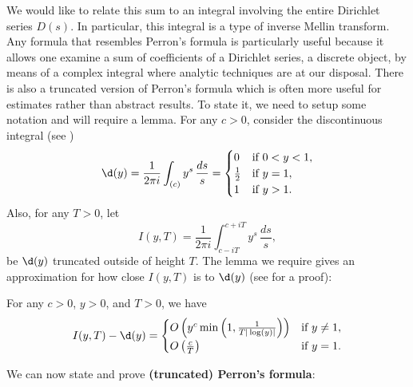     We would like to relate this sum to an integral involving the entire Dirichlet series $D(s)$. In particular, this integral is a type of inverse Mellin transform. Any formula that resembles Perron's formula is particularly useful because it allows one examine a sum of coefficients of a Dirichlet series, a discrete object, by means of a complex integral where analytic techniques are at our disposal. There is also a truncated version of Perron's formula which is often more useful for estimates rather than abstract results. To state it, we need to setup some notation and will require a lemma. For any $c > 0$, consider the discontinuous integral (see \cite{davenport1980multiplicative})
    \[
      \d(y) = \frac{1}{2\pi i}\int_{(c)}y^{s}\,\frac{ds}{s} = \begin{cases} 0 & \text{if $0 < y < 1$}, \\ \frac{1}{2} & \text{if $y = 1$}, \\ 1 & \text{if $y > 1$}. \end{cases}
    \]
    Also, for any $T > 0$, let
    \[
      I(y,T) = \frac{1}{2\pi i}\int_{c-iT}^{c+iT}y^{s}\,\frac{ds}{s},
    \]
    be $\d(y)$ truncated outside of height $T$. The lemma we require gives an approximation for how close $I(y,T)$ is to $\d(y)$ (see \cite{davenport1980multiplicative} for a proof):

    \begin{lemma}\label{lem:delta_truncation_estimate}
      For any $c > 0$, $y > 0$, and $T > 0$, we have
      \[
        I(y,T)-\d(y) = \begin{cases} O\left(y^{c}\min\left(1,\frac{1}{T|\log(y)|}\right)\right) & \text{if $y \neq 1$}, \\ O\left(\frac{c}{T}\right) & \text{if $y = 1$}. \end{cases}
      \]
    \end{lemma}

    We can now state and prove \textbf{(truncated) Perron's formula}:

